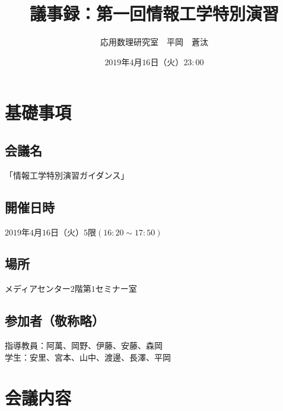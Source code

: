 %
%

\title{ 議事録：第一回情報工学特別演習} %
\author{応用数理研究室　平岡　蒼汰} %
\date{$2019$年$4$月$16$日（火）$23:00$} %


\maketitle %
%
\section{基礎事項}
\subsection{会議名}
\noindent 「情報工学特別演習ガイダンス」
\subsection{開催日時}
\noindent $2019$年$4$月$16$日（火）$5$限$(16:20 \sim 17:50)$
\subsection{場所}
\noindent メディアセンター$2$階第$1$セミナー室
\subsection{参加者（敬称略）}
\noindent 指導教員：阿萬、岡野、伊藤、安藤、森岡\\
学生：安里、宮本、山中、渡邊、長澤、平岡
\section{会議内容}
